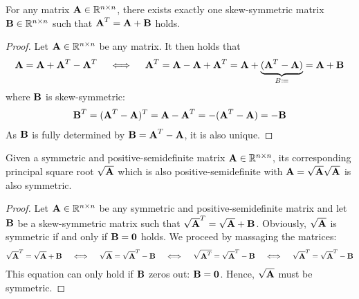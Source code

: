 		\begin{lemma}
			For any matrix \( \mat{A} \in \R^{n \times n} \), there exists exactly one skew-symmetric matrix \( \mat{B} \in \R^{n \times n} \) such that \( \mat{A}^T = \mat{A} + \mat{B} \) holds.
		\end{lemma}
		\begin{proof}
			Let \( \mat{A} \in \R^{n \times n} \) be any matrix. It then holds that
			\begin{align*}
				\mat{A} = \mat{A} + \mat{A}^T - \mat{A}^T \quad\iff\quad \mat{A}^T = \mat{A} - \mat{A} + \mat{A}^T = \mat{A} + \underbrace{(\mat{A}^T - \mat{A})}_{B \coloneqq} = \mat{A} + \mat{B}
			\end{align*}
			where \( \mat{B} \) is skew-symmetric:
			\begin{align*}
				\mat{B}^T = (\mat{A}^T - \mat{A})^T = \mat{A} - \mat{A}^T = -(\mat{A}^T - \mat{A}) = -\mat{B}
			\end{align*}
			As \(\mat{B}\) is fully determined by \( \mat{B} = \mat{A}^T - \mat{A} \), it is also unique.
		\end{proof}

		\begin{lemma}
			Given a symmetric and positive-semidefinite matrix \( \mat{A} \in \R^{n \times n} \), its corresponding principal square root \( \sqrt{\mat{A}} \) which is also positive-semidefinite with \( \mat{A} = \sqrt{\mat{A}} \sqrt{\mat{A}} \) is also symmetric.
		\end{lemma}
		\begin{proof}
			Let \( \mat{A} \in \R^{n \times n} \) be any symmetric and positive-semidefinite matrix and let \( \mat{B} \) be a skew-symmetric matrix such that \( \sqrt{\mat{A}}^T = \sqrt{\mat{A}} + \mat{B} \). Obviously, \( \sqrt{\mat{A}} \) is symmetric if and only if \( \mat{B} = \mat{0} \) holds. We proceed by massaging the matrices:
			\begin{align*}
				\sqrt{\mat{A}}^T = \sqrt{\mat{A}} + \mat{B}
					\quad\iff\quad \sqrt{\mat{A}} = \sqrt{\mat{A}}^T - \mat{B}
					\quad\iff\quad \sqrt{\mat{A}^T} = \sqrt{\mat{A}}^T - \mat{B}
					\quad\iff\quad \sqrt{\mat{A}}^T = \sqrt{\mat{A}}^T - \mat{B}
			\end{align*}
			This equation can only hold if \(\mat{B}\) zeros out: \( \mat{B} = \mat{0} \). Hence, \( \sqrt{\mat{A}} \) must be symmetric.
		\end{proof}

